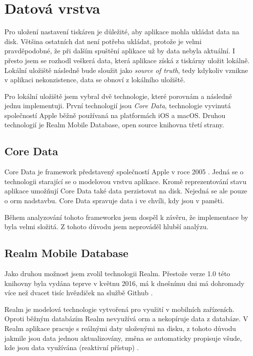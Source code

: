 \section{Datová vrstva}\label{analyza-datova-vrstva}

Pro uložení nastavení tiskáren je důležité, aby aplikace mohla ukládat data na disk.
Většina ostatních dat není potřeba ukládat, protože je velmi pravděpodobné, že při dalším spuštění aplikace už by data nebyla aktuální.
I přesto jsem se rozhodl veškerá data, která aplikace získá z tiskárny uložit lokálně.
Lokální uložiště následně bude sloužit jako \textit{source of truth}, tedy kdykoliv vznikne v aplikaci nekonzistence, data se obnoví z lokálního uložiště.

Pro lokální uložiště jsem vybral dvě technologie, které porovnám a následně jednu implementuji.
První technologií jsou \textit{Core Data}, technologie vyvinutá společností Apple běžně používaná na platformách iOS a macOS.
Druhou technologií je Realm Mobile Database, open source knihovna třetí strany.

\subsection{Core Data}

Core Data je framework představený společností Apple v roce 2005 \cite{objcio-core-data}.
Jedná se o technologii starající se o modelovou vrstvu aplikace.
Kromě reprezentování stavu aplikace umožňují Core Data také data perzistovat na disk.
Nejedná se ale pouze o \acrfull{orm} nadstavbu.
Core Data spravuje data i ve chvíli, kdy jsou v paměti.

Během analyzování tohoto frameworku jsem dospěl k závěru, že implementace by byla velmi složitá.
Z tohoto důvodu jsem neprováděl hlubší analýzu.

\subsection{Realm Mobile Database}\label{datova-vrstva-realm}

Jako druhou možnost jsem zvolil technologii Realm.
Přestože verze 1.0 této knihovny byla vydána teprve v květnu 2016, má k dnešnímu dni má dohromady více než dvacet tisíc hvězdiček na službě Github \cite{github-realm-repos}.

Realm je modelová technologie vytvořená pro využití v mobilních zařízeních.
Oproti běžným databázím Realm nevyužívá \acrshort{orm} a nekopíruje data z databáze.
V Realm aplikace pracuje s reálnými daty uloženými na disku, z tohoto důvodu jakmile jsou data jednou aktualizovány, změna se automaticky propisuje všude, kde jsou data využívána (reaktivní přístup) \cite{realm-overview}.

